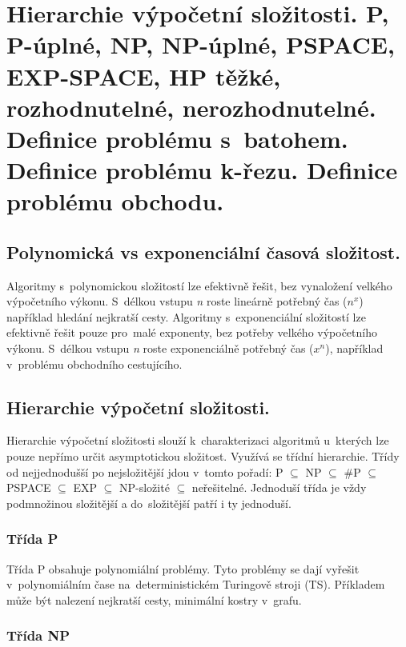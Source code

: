 \section{Hierarchie výpočetní složitosti. P, P-úplné, NP, NP-úplné, PSPACE, EXP-SPACE, HP těžké, rozhodnutelné, nerozhodnutelné. Definice problému s~batohem. Definice problému k-řezu. Definice problému obchodu.}

\subsection{Polynomická vs exponenciální časová složitost.}

Algoritmy s~polynomickou složitostí lze efektivně řešit, bez vynaložení velkého výpočetního výkonu. 
S~délkou vstupu \textit{n} roste lineárně potřebný čas ($n^x$) například hledání nejkratší cesty. 
Algoritmy s~exponenciální složitostí lze efektivně řešit pouze pro~malé exponenty, bez potřeby velkého výpočetního výkonu. 
S~délkou vstupu \textit{n} roste exponenciálně potřebný čas ($x^n$), například v~problému obchodního cestujícího.

\subsection{Hierarchie výpočetní složitosti.}


Hierarchie výpočetní složitosti slouží k~charakterizaci algoritmů u~kterých lze pouze nepřímo určit asymptotickou složitost. 
Využívá se třídní hierarchie. 
Třídy od nejjednodušší po nejsložitější jdou v~tomto pořadí: P $\subseteq$ NP $\subseteq$ \#P $\subseteq$ PSPACE $\subseteq$ EXP $\subseteq$ NP-složité $\subseteq$ neřešitelné. 
Jednoduší třída je vždy podmnožinou složitější a do~složitější patří i ty jednoduší.

\subsubsection{Třída P}

Třída P obsahuje polynomiální problémy. 
Tyto problémy se dají vyřešit v~polynomiálním čase na~deterministickém Turingově stroji (TS). 
Příkladem může být nalezení nejkratší cesty, minimální kostry v~grafu.

\subsubsection{Třída NP}

